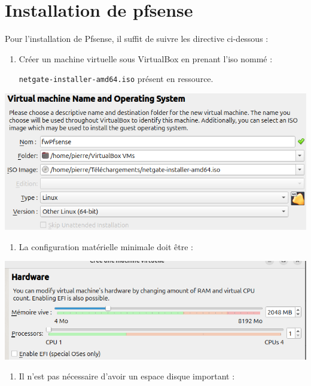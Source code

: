 \documentclass[french, 12pt]{article}%
\begin{document}
\clearpage
\appendix
\section{Installation de pfsense}
\label{lbl_pfsense}
Pour l'installation de Pfsense, il suffit de suivre les directive ci-dessous : 

\begin{enumerate}
\item Créer un machine virtuelle sous VirtualBox en prenant l'iso nommé : 

\verb?netgate-installer-amd64.iso? présent en ressource.
\end{enumerate}

\begin{center}
\includegraphics[scale=0.5]{./ressource/VM_Create_1.png}
\end{center}

\begin{enumerate}[resume]
\item La configuration matérielle minimale doit être : 
\end{enumerate}

\begin{center}
\includegraphics[scale=0.5]{./ressource/VM_Create_2.png}
\end{center}

\begin{enumerate}[resume]
\item Il n'est pas nécessaire d'avoir un espace disque important : 
\end{enumerate}
\end{document}
